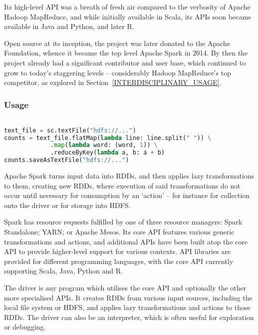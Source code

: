   Its high-level API was a breath of fresh air compared to the verbosity of Apache Hadoop MapReduce, and while initially available in Scala, its APIs soon became available in Java and Python, and later R.

  Open source at its inception, the project was later donated to the Apache Foundation, whence it became the top level Apache Spark in 2014. By then the project already had a significant contributor and user base, which continued to grow to today's staggering levels -- considerably Hadoop MapReduce's top competitor, as explored in Section~\ref{INTERDISCIPLINARY_USAGE}.


\subsubsection{Usage}
  
  \begin{lstlisting}[float=ht,
                     language=Python,
                     basicstyle=\ttfamily\footnotesize,
                     label=SPARK_WORDCOUNT,
                     caption={Apache Spark Python word count example as shown at: \url{https://spark.apache.org/examples.html}}]

text_file = sc.textFile("hdfs://...")
counts = text_file.flatMap(lambda line: line.split(" ")) \
             .map(lambda word: (word, 1)) \
             .reduceByKey(lambda a, b: a + b)
counts.saveAsTextFile("hdfs://...")
  \end{lstlisting}
  
  Apache Spark turns input data into RDDs, and then applies lazy transformations to them, creating new RDDs, where execution of said transformations do not occur until necessary for consumption by an `action' -- for instance for collection onto the driver or for storage into HDFS.

  Spark has resource requests fulfilled by one of three resource managers: Spark Standalone; YARN; or Apache Mesos. Its core API features various generic transformations and actions, and additional APIs have been built atop the core API to provide higher-level support for various contexts. API libraries are provided for different programming languages, with the core API currently supporting Scala, Java, Python and R.
  
  The driver is any program which utilises the core API and optionally the other more specialised APIs. It creates RDDs from various input sources, including the local file system or HDFS, and applies lazy transformations and actions to those RDDs. The driver can also be an interpreter, which is often useful for exploration or debugging.
  
